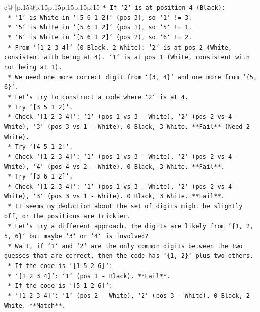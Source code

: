 \documentclass{article}
\begin{document}
{\begin{supertabular}{c@{$\;$}|p{.15\linewidth}@{}p{.15\linewidth}p{.15\linewidth}p{.15\linewidth}p{.15\linewidth}p{.15\linewidth}}
{{{\texttt{*   If `2` is at position 4 (Black):} \\
\texttt{    *   `1` is White in `{[}5 6 1 2{]}` (pos 3), so `1` != 3.} \\
\texttt{    *   `5` is White in `{[}5 6 1 2{]}` (pos 1), so `5` != 1.} \\
\texttt{    *   `6` is White in `{[}5 6 1 2{]}` (pos 2), so `6` != 2.} \\
\texttt{    *   From `{[}1 2 3 4{]}` (0 Black, 2 White): `2` is at pos 2 (White, consistent with being at 4). `1` is at pos 1 (White, consistent with not being at 1).} \\
\texttt{    *   We need one more correct digit from `\{3, 4\}` and one more from `\{5, 6\}`.} \\
\texttt{    *   Let's try to construct a code where `2` is at 4.} \\
\texttt{    *   Try `{[}3 5 1 2{]}`.} \\
\texttt{        *   Check `{[}1 2 3 4{]}`: `1` (pos 1 vs 3 {-} White), `2` (pos 2 vs 4 {-} White), `3` (pos 3 vs 1 {-} White). 0 Black, 3 White. **Fail** (Need 2 White).} \\
\texttt{    *   Try `{[}4 5 1 2{]}`.} \\
\texttt{        *   Check `{[}1 2 3 4{]}`: `1` (pos 1 vs 3 {-} White), `2` (pos 2 vs 4 {-} White), `4` (pos 4 vs 2 {-} White). 0 Black, 3 White. **Fail**.} \\
\texttt{    *   Try `{[}3 6 1 2{]}`.} \\
\texttt{        *   Check `{[}1 2 3 4{]}`: `1` (pos 1 vs 3 {-} White), `2` (pos 2 vs 4 {-} White), `3` (pos 3 vs 1 {-} White). 0 Black, 3 White. **Fail**.} \\
\texttt{    *   It seems my deduction about the set of digits might be slightly off, or the positions are trickier.} \\
\texttt{    *   Let's try a different approach. The digits are likely from `\{1, 2, 5, 6\}` but maybe `3` or `4` is involved?} \\
\texttt{    *   Wait, if `1` and `2` are the only common digits between the two guesses that are correct, then the code has `\{1, 2\}` plus two others.} \\
\texttt{    *   If the code is `{[}1 5 2 6{]}`:} \\
\texttt{        *   `{[}1 2 3 4{]}`: `1` (pos 1 {-} Black). **Fail**.} \\
\texttt{    *   If the code is `{[}5 1 2 6{]}`:} \\
\texttt{        *   `{[}1 2 3 4{]}`: `1` (pos 2 {-} White), `2` (pos 3 {-} White). 0 Black, 2 White. **Match**.} \\
}}}
\end{supertabular}}
\end{document}
